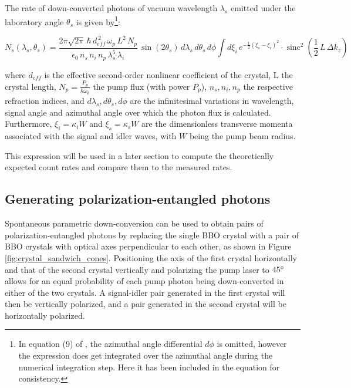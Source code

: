 \documentclass[a4paper,
DIV=13,
12pt,
BCOR=10mm,
department=FakEI,
twoside,
parskip=half,
automark,
logostyle=flat,
]{OTHRartcl}
\begin{document}
The rate of down-converted photons of vacuum wavelength $\lambda_s$ emitted under the laboratory angle $\theta_s$ is given by\footnote{In equation (9) of \cite{spdc-intensity}, the azimuthal angle differential $d\phi$ is omitted, however the expression does get integrated over the azimuthal angle during the numerical integration step. Here it has been included in the equation for consistency.}:

\begin{equation}
    N_s(\lambda_s, \theta_s) = \frac{2\pi \sqrt{2\pi}\, \hbar\, d_{eff}^{\,2}\, \omega_p\, L^2\, N_p}{\epsilon_0\, n_s\, n_i\, n_p\, \lambda_s^5\, \lambda_i}\, \sin(2\theta_s)\, d\lambda_s\, d\theta_s\, d\phi \int d\xi_i\, e^{-\frac{1}{2}(\xi_s - \xi_i)^2} \cdot \operatorname{sinc}^2\!\left(\frac{1}{2}\, L\, \Delta k_z\right)
    \label{spdc_intensity}
\end{equation}

where $d_{eff}$ is the effective second-order nonlinear coefficient of the crystal, L the crystal length, $N_p = \frac{P_p}{\hbar \omega_p}$ the pump flux (with power $P_p$), $n_s, n_i, n_p$ the respective refraction indices, and $d \lambda_s, d\theta_s, d\phi$ are the infinitesimal variations in wavelength, signal angle and azimuthal angle over which the photon flux is calculated. Furthermore, $\xi_i = \kappa_i W$ and $\xi_s = \kappa_s W$ are the dimensionless transverse momenta associated with the signal and idler waves, with $W$ being the pump beam radius.

This expression will be used in a later section to compute the theoretically expected count rates and compare them to the measured rates. 


\subsection{Generating polarization-entangled photons}

Spontaneous parametric down-conversion can be used to obtain pairs of polarization-entangled photons by replacing the single BBO crystal with a pair of BBO crystals with optical axes perpendicular to each other, as shown in Figure \ref{fig:crystal_sandwich_cones}. Positioning the axis of the first crystal horizontally and that of the second crystal vertically and polarizing the pump laser to $45\degree$ allows for an equal probability of each pump photon being down-converted in either of the two crystals. A signal-idler pair generated in the first crystal will then be vertically polarized, and a pair generated in the second crystal will be horizontally polarized.
\end{document}
